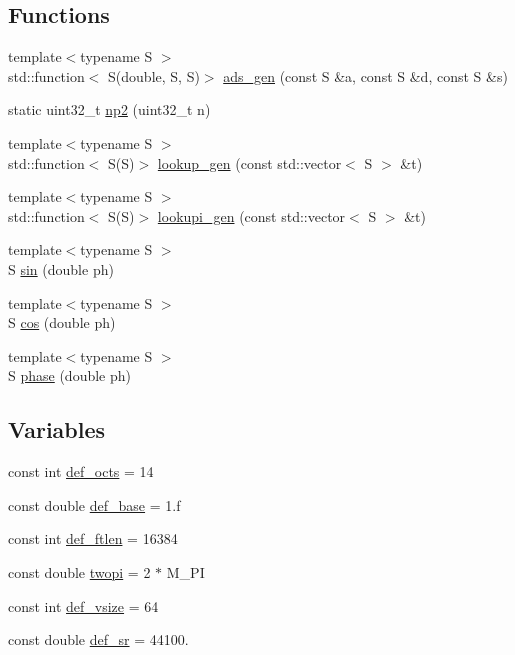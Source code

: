 \subsection*{Functions}
\begin{DoxyCompactItemize}
\item 
{\footnotesize template$<$typename S $>$ }\\std\+::function$<$ S(double, S, S)$>$ \hyperlink{namespace_aurora_a966a076f1768216bd9c2d6a07aebf034}{ads\+\_\+gen} (const S \&a, const S \&d, const S \&s)
\item 
static uint32\+\_\+t \hyperlink{namespace_aurora_a49b6f6d92479d80271ced42627154066}{np2} (uint32\+\_\+t n)
\item 
{\footnotesize template$<$typename S $>$ }\\std\+::function$<$ S(S)$>$ \hyperlink{namespace_aurora_ade912bee8dbe0351b2193809ce592d8b}{lookup\+\_\+gen} (const std\+::vector$<$ S $>$ \&t)
\item 
{\footnotesize template$<$typename S $>$ }\\std\+::function$<$ S(S)$>$ \hyperlink{namespace_aurora_a043c55515e053a8d6f31ed7077a1bea6}{lookupi\+\_\+gen} (const std\+::vector$<$ S $>$ \&t)
\item 
{\footnotesize template$<$typename S $>$ }\\S \hyperlink{namespace_aurora_a388ea5736944d8887f5586afd45a03b8}{sin} (double ph)
\item 
{\footnotesize template$<$typename S $>$ }\\S \hyperlink{namespace_aurora_ab6ef1b966b8f27d107fcabe1027a677a}{cos} (double ph)
\item 
{\footnotesize template$<$typename S $>$ }\\S \hyperlink{namespace_aurora_a2fab91108d29c7101741bcd2ebe1ba72}{phase} (double ph)
\end{DoxyCompactItemize}
\subsection*{Variables}
\begin{DoxyCompactItemize}
\item 
const int \hyperlink{namespace_aurora_a09d7b7aef171c72e46db6eac0226636b}{def\+\_\+octs} = 14
\item 
const double \hyperlink{namespace_aurora_acb267dff62f74484893c2d5b679b78bf}{def\+\_\+base} = 1.f
\item 
const int \hyperlink{namespace_aurora_a14dabfd9feedfa09c0e6f86d2627f006}{def\+\_\+ftlen} = 16384
\item 
const double \hyperlink{namespace_aurora_a4c08f8416c2b35d5001062f121459b5a}{twopi} = 2 $\ast$ M\+\_\+\+PI
\item 
const int \hyperlink{namespace_aurora_afaaddf667a06e7ce23c667a8b7295263}{def\+\_\+vsize} = 64
\item 
const double \hyperlink{namespace_aurora_ad49263d809bea98dd422e95bc91bc03e}{def\+\_\+sr} = 44100.
\end{DoxyCompactItemize}


